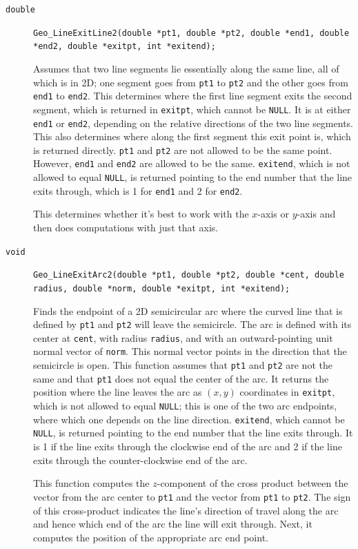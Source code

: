 \documentclass[11pt]{article}
\newcommand {\ttt} {\texttt}
\begin{document}
\begin{description}
\item[\ttt{double}]
\ttt{Geo\_LineExitLine2(double *pt1, double *pt2, double *end1, double *end2, double *exitpt, int *exitend);}

Assumes that two line segments lie essentially along the same line, all of which is in 2D; one segment goes from \ttt{pt1} to \ttt{pt2} and the other goes from \ttt{end1} to \ttt{end2}. This determines where the first line segment exits the second segment, which is returned in \ttt{exitpt}, which cannot be \ttt{NULL}. It is at either \ttt{end1} or \ttt{end2}, depending on the relative directions of the two line segments. This also determines where along the first segment this exit point is, which is returned directly. \ttt{pt1} and \ttt{pt2} are not allowed to be the same point. However, \ttt{end1} and \ttt{end2} are allowed to be the same. \ttt{exitend}, which is not allowed to equal \ttt{NULL}, is returned pointing to the end number that the line exits through, which is 1 for \ttt{end1} and 2 for \ttt{end2}.

This determines whether it's best to work with the $x$-axis or $y$-axis and then does computations with just that axis.

\item[\ttt{void}]
\ttt{Geo\_LineExitArc2(double *pt1, double *pt2, double *cent, double radius, double *norm, double *exitpt, int *exitend);}

Finds the endpoint of a 2D semicircular arc where the curved line that is defined by \ttt{pt1} and \ttt{pt2} will leave the semicircle. The arc is defined with its center at \ttt{cent}, with radius \ttt{radius}, and with an outward-pointing unit normal vector of \ttt{norm}. This normal vector points in the direction that the semicircle is open. This function assumes that \ttt{pt1} and \ttt{pt2} are not the same and that \ttt{pt1} does not equal the center of the arc. It returns the position where the line leaves the arc as $(x,y)$ coordinates in \ttt{exitpt}, which is not allowed to equal \ttt{NULL}; this is one of the two arc endpoints, where which one depends on the line direction. \ttt{exitend}, which cannot be \ttt{NULL}, is returned pointing to the end number that the line exits through. It is 1 if the line exits through the clockwise end of the arc and 2 if the line exits through the counter-clockwise end of the arc.

This function computes the $z$-component of the cross product between the vector from the arc center to \ttt{pt1} and the vector from \ttt{pt1} to \ttt{pt2}. The sign of this cross-product indicates the line's direction of travel along the arc and hence which end of the arc the line will exit through. Next, it computes the position of the appropriate arc end point.


\end{description}
\end{document}
